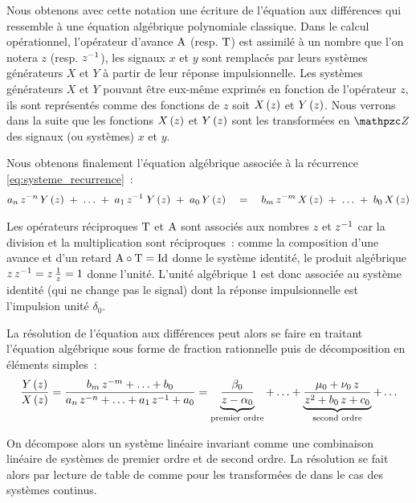 Nous obtenons avec cette notation une écriture de l'équation aux
différences qui ressemble à une équation algébrique polynomiale
classique. Dans le calcul opérationnel, l'opérateur d'avance
$\mathrm{A}$ (resp. $\mathrm{T}$) est assimilé à un nombre que l'on notera
$z$ (resp. $z^{-1}$), les signaux $x$ et $y$ sont remplacés par leurs
systèmes générateurs $X$ et $Y$ à partir de leur réponse
impulsionnelle. Les systèmes générateurs $X$ et $Y$ pouvant être
eux-même exprimés en fonction de l'opérateur $z$, ils sont représentés
comme des fonctions de $z$ soit $X\left(z\right)$ et $Y\left(z\right)$. Nous verrons
dans la suite que les fonctions $X\left(z\right)$ et $Y\left(z\right)$ sont les
transformées en $\TZ$ des signaux (ou systèmes) $x$ et $y$.

Nous obtenons finalement l'équation algébrique associée à la récurrence
\eqref{eq:systeme_recurrence}~:
\begin{eqnarray}
  \label{eq:systeme_algebrique}
  a_n\,z^{-n}\,Y\left(z\right)\; +\; \ldots \;+\; a_1\,z^{-1}\;Y\left(z\right) \;+\; a_0\,Y\left(z\right) \quad  = \quad b_m\,z^{-m}\,X\left(z\right) \;+\; \ldots \;+\; b_0\,X\left(z\right)
\end{eqnarray}

Les opérateurs réciproques $\mathrm{T}$ et $\mathrm{A}$ sont associés aux
nombres $z$ et $z^{-1}$ car la division et la multiplication sont
réciproques~: comme la composition d'une avance et d'un retard
$\mathrm{A} \circ \mathrm{T} = \mathrm{Id}$ donne le système identité, le produit
algébrique $z\,z^{-1}=z\,\frac{1}{z}=1$ donne l'unité. L'unité
algébrique $1$ est donc associée au \og{}système identité \fg{} (qui
ne change pas le signal) dont la réponse impulsionnelle est
l'impulsion unité $\delta_0$.

La résolution de l'équation aux différences peut alors se faire en
traitant l'équation algébrique sous forme de fraction rationnelle puis
de décomposition en éléments simples~:
\begin{eqnarray}
  \label{eq:systeme_algebrique}
 \frac{Y\left(z\right)}{X\left(z\right)} = \frac{b_m\,z^{-m} + \ldots + b_0}{a_n\,z^{-n}+ \ldots +  a_1\,z^{-1} + a_0} = \underbrace{\frac{\beta_0}{z-\alpha_0}}_{\text{premier ordre}} + \ldots + \underbrace{\frac{\mu_0+\nu_0\,z}{z^2+b_0\,z+c_0}}_{\text{second ordre}} + \ldots
\end{eqnarray}

On décompose alors un système linéaire invariant comme une combinaison
linéaire de systèmes de premier ordre et de second ordre. La
résolution se fait alors par lecture de table de \teZ{} comme pour les
transformées de \Laplace{} dans le cas des systèmes continus.

